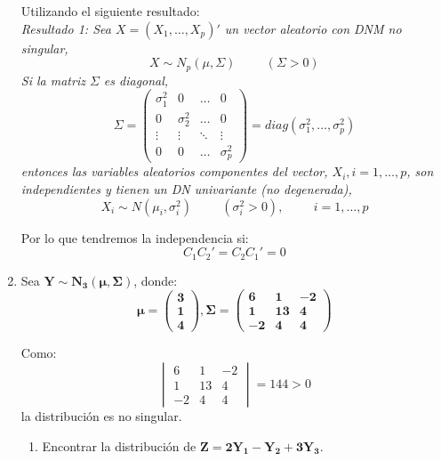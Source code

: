 \documentclass[11pt,a4paper]{article}
\begin{document}
\begin{enumerate}[label=\arabic*.]
Utilizando el siguiente resultado: \\
\itshape
Resultado 1: Sea $X = (X_{1}, \dots, X_{p})'$ un vector aleatorio con DNM no singular,
$$X \sim N_{p}(\mu, \Sigma) \hspace{1cm} (\Sigma > 0)$$
Si la matriz $\Sigma$ es diagonal,
$$\Sigma = \begin{pmatrix}
\sigma_{1}^{2} & 0 & \dots & 0 \\
0 & \sigma_{2}^{2} & \dots & 0 \\
\vdots & \vdots & \ddots & \vdots \\
0 & 0 & \dots & \sigma_{p}^{2}
\end{pmatrix} = diag(\sigma_{1}^{2}, \dots, \sigma_{p}^{2})$$
entonces las variables aleatorios componentes del vector, $X_{i}, i = 1, \dots, p$, son independientes y tienen un DN univariante (no degenerada),
$$X_{i} \sim N(\mu_{i}, \sigma_{i}^{2}) \hspace{1cm} (\sigma_{i}^{2} > 0), \hspace{1cm} i = 1, \dots, p$$
\normalfont

Por lo que tendremos la independencia si:
$$C_{1}C_{2}' = C_{2}C_{1}' = 0$$

\newpage
\bfseries
\item Sea $\mathbf{Y \sim N_{3}(\mu, \Sigma)}$, donde:
$$\mathbf{\mu = \begin{pmatrix} \mathbf{3} \\ \mathbf{1} \\ \mathbf{4} \end{pmatrix}, \Sigma = \begin{pmatrix}
\mathbf{6} & \mathbf{1} & \mathbf{-2} \\
\mathbf{1} & \mathbf{13} & \mathbf{4} \\
\mathbf{-2} & \mathbf{4} & \mathbf{4}
\end{pmatrix}}$$
\vspace{0.5cm}
\normalfont

Como:
$$\begin{vmatrix}
6 & 1 & -2 \\
1 & 13 & 4 \\
-2 & 4 & 4
\end{vmatrix} = 144 > 0$$
la distribución es no singular.

\bfseries
\vspace{1cm}
\begin{enumerate}[label=\arabic*)]
\item Encontrar la distribución de $\mathbf{Z = 2Y_{1} - Y_{2} + 3Y_{3}}$.
\vspace{0.5cm}
\normalfont


\end{enumerate}
\end{enumerate}
\end{document}
